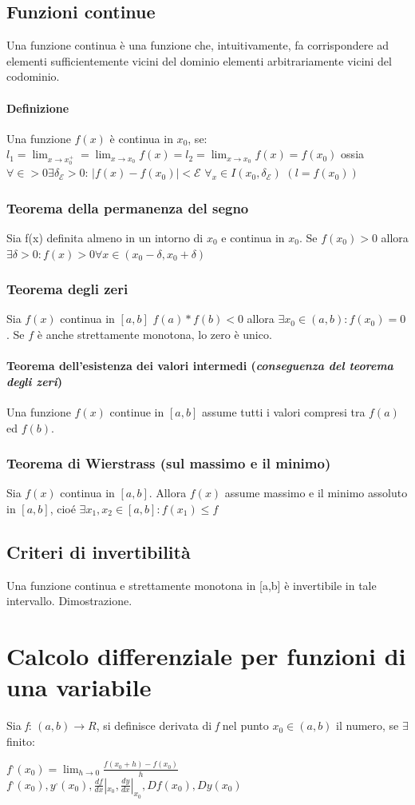 \subsection{Funzioni continue}
Una funzione continua è una funzione che, intuitivamente, fa corrispondere ad elementi sufficientemente vicini del dominio elementi arbitrariamente vicini del codominio.
\paragraph{Definizione} Una funzione $f(x)$ è continua in $x_0$, se: $l_1=\lim_{x\to x^+_0}=\lim_{x\to x_0}f(x)=l_2=\lim_{x\to x_0}f(x)=f(x_0)$ ossia $\forall\in>0\exists \delta_\mathcal{E} > 0$: $|f(x)-f(x_0)|<\mathcal{E}$ $\forall_x\in I(x_0,\delta_\mathcal{E})$ $(l=f(x_0))$
\subsubsection{Teorema della permanenza del segno}
Sia f(x) definita almeno in un intorno di $x_0$ e continua in $x_0$. Se $f(x_0)>0$ allora $\exists \delta >0 : f(x) >0 \forall x\in (x_0-\delta ,x_0+\delta{})$
\subsubsection{Teorema degli zeri}
Sia $f(x)$ continua in $[a,b]$ $f(a)*f(b)<0$ allora $\exists x_0 \in (a,b): f(x_0)=0$. Se $f$ è anche strettamente monotona, lo zero è unico.
\paragraph{Teorema dell'esistenza dei valori intermedi (\textit{conseguenza del teorema degli zeri})}  
Una funzione $f(x)$ continue in $[a,b]$ assume tutti i valori compresi tra $f(a)$ ed $f(b)$.
\subsubsection{Teorema di Wierstrass (sul massimo e il minimo)}
Sia $f(x)$ continua in $[a,b]$. Allora $f(x)$ assume massimo e il minimo assoluto in $[a,b]$, cioé $\exists x_1, x_2 \in [a,b]: f(x_1)\leq f$
\subsection{Criteri di invertibilità}
Una funzione continua e strettamente monotona in [a,b] è invertibile in tale intervallo. Dimostrazione.
\section{Calcolo differenziale per funzioni di una variabile}
Sia \textit{f}: $(a,b)\to R$, si definisce derivata di \textit{f} nel punto
$x_0\in (a,b)$ il numero, se $\exists$ finito:
\begin{center}
	$f^, (x_0)=\lim_{h\to 0}\frac{f(x_0+h)-f(x_0)}{h}$\\
	$f^,(x_0),y^,(x_0),\frac{df}{dx}|_{x_0}, \frac{dy}{dx}|_{x_0},
	Df(x_0),Dy(x_0)$
\end{center}
